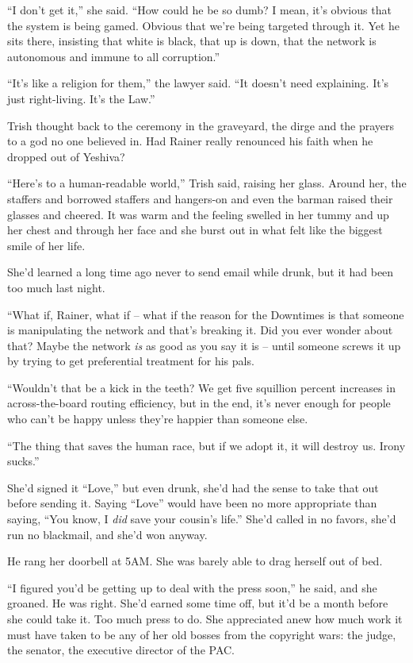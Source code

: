 “I don't get it,” she said. “How could he be so dumb? I mean, 
it's obvious that the system is being gamed. Obvious that we're being 
targeted through it. Yet he sits there, insisting that white is black, 
that up is down, that the network is autonomous and immune to all 
corruption.”

“It's like a religion for them,” the lawyer said. “It doesn't 
need explaining. It's just right-living. It's the Law.”

Trish thought back to the ceremony in the graveyard, the dirge and the 
prayers to a god no one believed in. Had Rainer really renounced his 
faith when he dropped out of Yeshiva?

“Here's to a human-readable world,” Trish said, raising her glass. 
Around her, the staffers and borrowed staffers and hangers-on and even 
the barman raised their glasses and cheered. It was warm and the 
feeling swelled in her tummy and up her chest and through her face and 
she burst out in what felt like the biggest smile of her life.

\tb

She'd learned a long time ago never to send email while drunk, but it 
had been too much last night.

“What if, Rainer, what if -- what if the reason for the Downtimes is 
that someone is manipulating the network and that's breaking it. Did 
you ever wonder about that? Maybe the network \emph{is} as good as you 
say it is -- until someone screws it up by trying to get preferential 
treatment for his pals.

“Wouldn't that be a kick in the teeth? We get five squillion percent 
increases in across-the-board routing efficiency, but in the end, it's 
never enough for people who can't be happy unless they're happier than 
someone else.

“The thing that saves the human race, but if we adopt it, it will 
destroy us. Irony sucks.”

She'd signed it “Love,” but even drunk, she'd had the sense to take 
that out before sending it. Saying “Love” would have been no more 
appropriate than saying, “You know, I \emph{did} save your cousin's 
life.” She'd called in no favors, she'd run no blackmail, and she'd 
won anyway.

He rang her doorbell at 5AM. She was barely able to drag herself out of 
bed.

“I figured you'd be getting up to deal with the press soon,” he 
said, and she groaned. He was right. She'd earned some time off, but 
it'd be a month before she could take it. Too much press to do. She 
appreciated anew how much work it must have taken to be any of her old 
bosses from the copyright wars: the judge, the senator, the executive 
director of the PAC.

